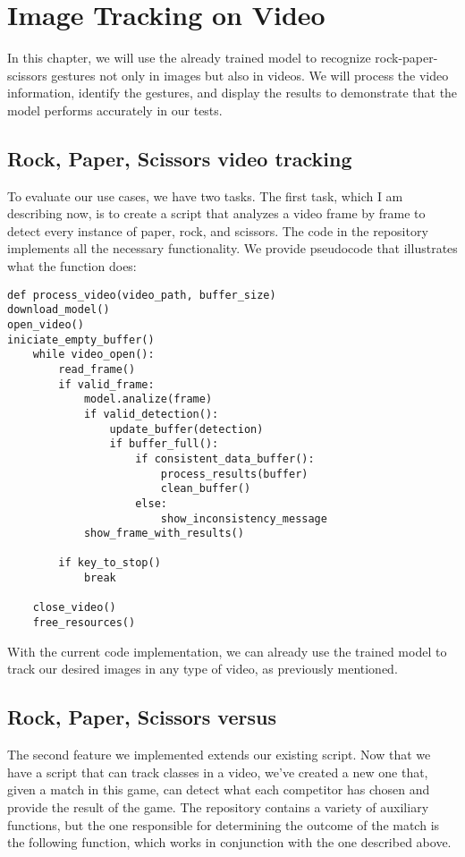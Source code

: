 \documentclass[../main]{subfiles}
\begin{document}
\chapter{Image Tracking on Video}

{
\hypersetup{linkcolor=black}
\minitoc
\vspace{5mm}
}
In this chapter, we will use the already trained model to recognize rock-paper-scissors gestures not only in images but also in videos. We will process the video information, identify the gestures, and display the results to demonstrate that the model performs accurately in our tests.

\section{Rock, Paper, Scissors video tracking}
To evaluate our use cases, we have two tasks. The first task, which I am describing now, is to create a script that analyzes a video frame by frame to detect every instance of paper, rock, and scissors. The code in the repository implements all the necessary functionality. We provide pseudocode that illustrates what the function does:
\begin{lstlisting}
def process_video(video_path, buffer_size)
download_model()
open_video()
iniciate_empty_buffer()
    while video_open():
        read_frame()
        if valid_frame:
            model.analize(frame)
            if valid_detection():
                update_buffer(detection)
                if buffer_full():
                    if consistent_data_buffer():
                        process_results(buffer)
                        clean_buffer()
                    else:
                        show_inconsistency_message
            show_frame_with_results()

        if key_to_stop()
            break

    close_video()
    free_resources()
\end{lstlisting}
With the current code implementation, we can already use the trained model to track our desired images in any type of video, as previously mentioned.
\section{Rock, Paper, Scissors versus}
The second feature we implemented extends our existing script. Now that we have a script that can track classes in a video, we’ve created a new one that, given a match in this game, can detect what each competitor has chosen and provide the result of the game. The repository contains a variety of auxiliary functions, but the one responsible for determining the outcome of the match is the following function, which works in conjunction with the one described above.
\end{document}
